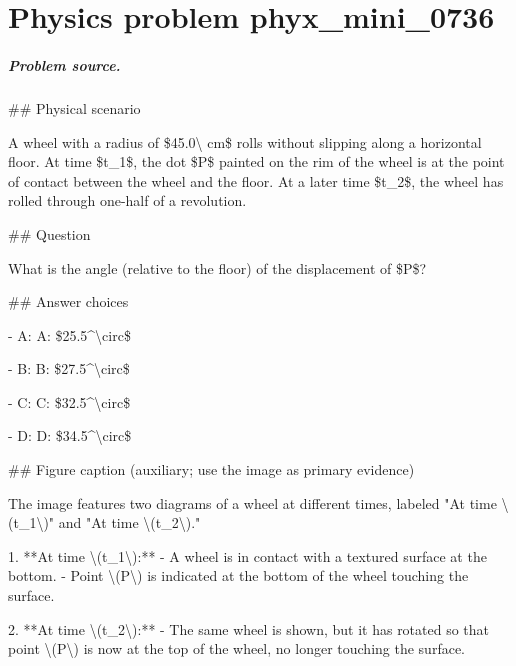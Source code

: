 
\chapter{Physics problem phyx\_mini\_0736}
\label{ch:PhyXMiniProblems_problem_phyx_mini_0736}

\paragraph{Problem source.}
\#\# Physical scenario

A wheel with a radius of \$45.0\textbackslash{} cm\$ rolls without slipping along a horizontal floor. At time \$t\_1\$, the dot \$P\$ painted on the rim of the wheel is at the point of contact between the wheel and the floor. At a later time \$t\_2\$, the wheel has rolled through one-half of a revolution.

\#\# Question

What is the angle (relative to the floor) of the displacement of \$P\$?

\#\# Answer choices

- A: A: \$25.5\textasciicircum{}\textbackslash{}circ\$

- B: B: \$27.5\textasciicircum{}\textbackslash{}circ\$

- C: C: \$32.5\textasciicircum{}\textbackslash{}circ\$

- D: D: \$34.5\textasciicircum{}\textbackslash{}circ\$

\#\# Figure caption (auxiliary; use the image as primary evidence)

The image features two diagrams of a wheel at different times, labeled "At time \textbackslash{}(t\_1\textbackslash{})" and "At time \textbackslash{}(t\_2\textbackslash{})." 

1. **At time \textbackslash{}(t\_1\textbackslash{}):**
   - A wheel is in contact with a textured surface at the bottom.
   - Point \textbackslash{}(P\textbackslash{}) is indicated at the bottom of the wheel touching the surface.

2. **At time \textbackslash{}(t\_2\textbackslash{}):**
   - The same wheel is shown, but it has rotated so that point \textbackslash{}(P\textbackslash{}) is now at the top of the wheel, no longer touching the surface.

